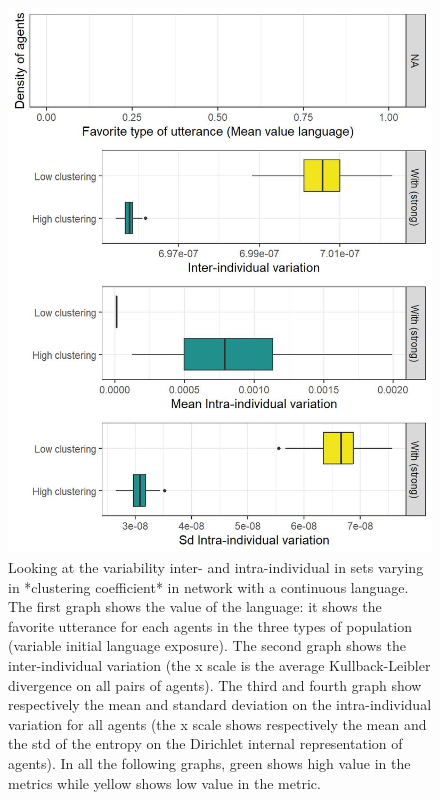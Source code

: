 \documentclass[
]{article}
\begin{document}
\begin{figure}[!H]

{\centering \includegraphics{./Figures/unnamed-chunk-57-1} 

}

\caption{Looking at the variability inter- and intra-individual in sets varying in *clustering coefficient* in network with a continuous language. The first graph shows the value of the language: it shows the favorite utterance for each agents in the three types of population (variable initial language exposure). The second graph shows the  inter-individual variation (the x scale is the average Kullback-Leibler divergence on all pairs of agents). The third and fourth graph show respectively the mean and standard deviation on the intra-individual variation for all agents (the x scale shows respectively the mean and the std of the entropy on the Dirichlet internal representation of agents). In all the following graphs, green shows high value in the metrics while yellow shows low value in the metric.}\label{fig:unnamed-chunk-57}
\end{figure}
\end{document}
